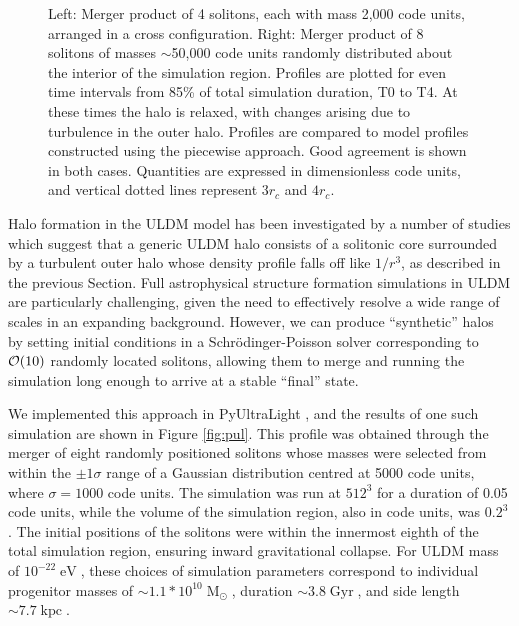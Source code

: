 \documentclass[a4paper,11pt]{article}
\begin{document}
\begin{figure}
\begin{tabular}{cc}
\end{tabular}
\caption{Left: Merger product of 4 solitons, each with mass 2,000 code units, arranged in a cross configuration. Right: Merger product of 8 solitons of masses $\sim$50,000 code units randomly distributed about the interior of the simulation region. Profiles are plotted for even time intervals from 85\% of total simulation duration, T0 to T4. At these times the halo is relaxed, with changes arising due to turbulence in the outer halo. Profiles are compared to model profiles constructed using the piecewise approach. Good agreement is shown in both cases. Quantities are expressed in dimensionless code units, and vertical dotted lines represent $3r_c$ and $4r_c$. }\label{fig:validity}
\end{figure}


Halo formation in the ULDM model has been investigated by a number of studies \cite{Schwabe:2016rze, Mocz:2017wlg, Lin:2018whl} which suggest that a generic ULDM halo consists of a solitonic core surrounded by a turbulent outer halo whose density profile falls off like $1/r^3$, as described in the previous Section. Full astrophysical structure formation simulations in ULDM are particularly challenging, given the need to effectively resolve a wide range of scales in an expanding background. However, we can produce ``synthetic'' halos by setting initial conditions in a Schr{\"o}dinger-Poisson  solver corresponding to ${\cal{O}}(10)$ randomly located solitons, allowing them to merge and running the simulation long enough to arrive at a stable ``final'' state. 

We  implemented this approach in {\sc PyUltraLight}  \cite{Edwards:2018ccc}, and the results of one such simulation are shown in Figure \ref{fig:pul}. This profile was obtained through the merger of eight randomly positioned solitons whose masses were selected from within the $\pm 1\sigma$ range of a Gaussian distribution centred at 5000 code units, where $\sigma = 1000$ code units.
The simulation was run at $512^3$ for a duration of 0.05 code units, while the volume of the simulation region, also in code units, was $0.2^3$. The initial positions of the solitons were within the innermost eighth of the total simulation region, ensuring inward gravitational collapse. For ULDM  mass of $10^{-22}\operatorname{eV}$, these choices of simulation parameters correspond to individual progenitor masses of $\sim 1.1*10^{10}\operatorname{M}_{\odot}$, duration $\sim 3.8 \operatorname{Gyr}$, and side length $\sim 7.7 \operatorname{kpc}$. 
\end{document}
